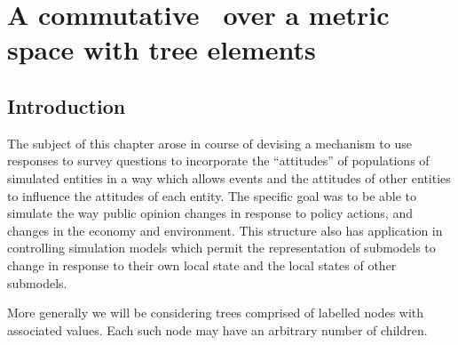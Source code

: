 






\chapter[A COMMUTATIVE RNG OVER A METRIC SPACE WITH TREE ELEMENTS]
        {A commutative \rng\ over a metric space with tree elements}\label{treering}

\section{Introduction}
The subject of this chapter arose in course of devising a mechanism to
use responses to survey questions to incorporate the ``attitudes'' of
populations of simulated entities in a way which allows events and the
attitudes of other entities to influence the attitudes of each entity.
The specific goal was to be able to simulate the way public opinion
changes in response to policy actions, and changes in the economy and
environment. This structure also has application in controlling
simulation models which permit the representation of submodels to
change in response to their own local state and the local states of
other submodels.

More generally we will be considering trees comprised of labelled
nodes with associated values.  Each such node may have an arbitrary
number of children. 

